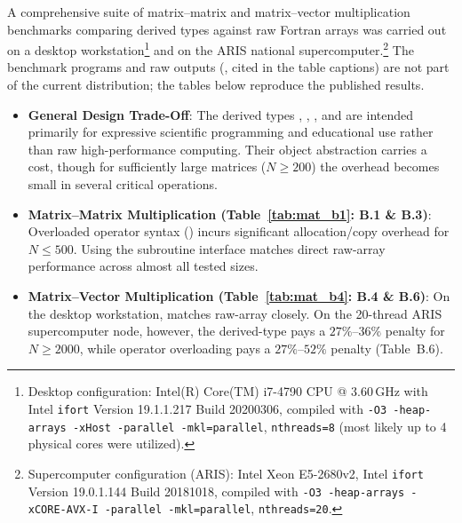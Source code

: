 A comprehensive suite of matrix--matrix and matrix--vector multiplication benchmarks comparing  derived types against raw Fortran arrays was carried out on a desktop workstation\footnote{Desktop configuration: Intel(R) Core(TM) i7-4790 CPU @ 3.60\,GHz with Intel \texttt{ifort} Version 19.1.1.217 Build 20200306, compiled with \texttt{-O3 -heap-arrays -xHost -parallel -mkl=parallel}, \texttt{nthreads=8} (most likely up to 4 physical cores were utilized).} and on the ARIS national supercomputer.\footnote{Supercomputer configuration (ARIS): Intel Xeon E5-2680v2, Intel \texttt{ifort} Version 19.0.1.144 Build 20181018, compiled with \texttt{-O3 -heap-arrays -xCORE-AVX-I -parallel -mkl=parallel}, \texttt{nthreads=20}.} The benchmark programs and raw outputs (, cited in the table captions) are not part of the current  distribution; the tables below reproduce the published results.

\begin{notebox}
\begin{itemize}
  \item \textbf{General Design Trade-Off}: The derived types , , , and  are intended primarily for expressive scientific programming and educational use rather than raw high-performance computing. Their object abstraction carries a cost, though for sufficiently large matrices ($N \ge 200$) the overhead becomes small in several critical operations.
  \item \textbf{Matrix--Matrix Multiplication (Table~\ref{tab:mat_b1}: B.1 \& B.3)}: Overloaded operator syntax () incurs significant allocation/copy overhead for $N \le 500$. Using the subroutine interface  matches direct raw-array  performance across almost all tested sizes.
  \item \textbf{Matrix--Vector Multiplication (Table~\ref{tab:mat_b4}: B.4 \& B.6)}: On the desktop workstation,  matches raw-array  closely. On the 20-thread ARIS supercomputer node, however, the derived-type  pays a $27\%$--$36\%$ penalty for $N \ge 2000$, while operator overloading  pays a $27\%$--$52\%$ penalty (Table~B.6).
\end{itemize}
\end{notebox}

